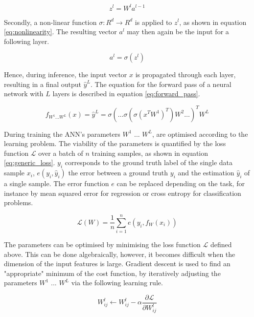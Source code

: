 $$ z^l = W^l a^{l-1} $$

Secondly, a non-linear function $\sigma: R^d \rightarrow R^d$ is applied to $z^{l}$, as shown in equation \ref{eq:nonlinearity}. The resulting vector $a^l$ may then again be the input for a following layer.

\begin{equation}
	a^l = \sigma(z^{l})	\label{eq:nonlinearity}
\end{equation}

Hence, during inference, the input vector $x$ is propagated through each layer, resulting in a final output $\hat{y}^L$. The equation for the forward pass of a neural network with $L$ layers is described in equation \ref{eq:forward_pass}. 

\begin{equation}
	f_{W^1 ... W^L}(x) = \hat{y}^L = \sigma(… \sigma( \sigma( x^T W^1 )^T) W^2 …)^T W^L \label{eq:forward_pass}
\end{equation}

During training the ANN's parameters $W^1$ ... $W^L$, are optimised according to the learning problem. The viability of the parameters is quantified by the loss function $\mathcal{L}$ over a batch of $n$ training samples, as shown in equation \ref{eq:generic_loss}. $y_i$ corresponds to the ground truth label of the single data sample $x_i$, $e(y_i, \hat{y}_i)$ the error between a ground truth $y_i$ and the estimation $\hat{y}_i$ of a single sample. The error function $e$ can be replaced depending on the task, for instance by mean squared error for regression or cross entropy for classification problems.

\begin{equation}
	\mathcal{L}(W) = \frac{1}{n}\sum_{i=1}^n e(y_i, f_{W}(x_i)) \label{eq:generic_loss}
\end{equation}

The parameters can be optimised by minimising the loss function $\mathcal{L}$ defined above. This can be done algebraically, however, it becomes difficult when the dimension of the input features is large. Gradient descent is used to find an "appropriate" minimum of the cost function, by iteratively adjusting the parameters $W^1$ ... $W^L$ via the following learning rule.

\begin{equation}
	W^l_{ij} \leftarrow W^l_{ij} - \alpha \frac{\partial \mathcal{L}}{\partial W^l_{ij}}
\end{equation}

